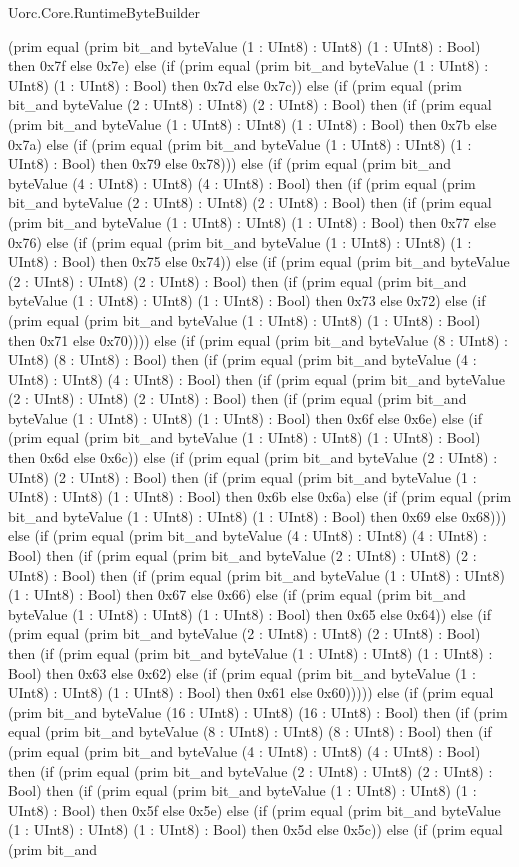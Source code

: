 \begin{lexlean}{Uorc.Core.RuntimeByteBuilder}
\begin{semanticmodule}
{(prim equal (prim bit_and byteValue (1 : UInt8) : UInt8) (1 : UInt8) : Bool) then 0x7f else 0x7e) else (if (prim equal (prim bit_and byteValue (1 : UInt8) : UInt8) (1 : UInt8) : Bool) then 0x7d else 0x7c)) else (if (prim equal (prim bit_and byteValue (2 : UInt8) : UInt8) (2 : UInt8) : Bool) then (if (prim equal (prim bit_and byteValue (1 : UInt8) : UInt8) (1 : UInt8) : Bool) then 0x7b else 0x7a) else (if (prim equal (prim bit_and byteValue (1 : UInt8) : UInt8) (1 : UInt8) : Bool) then 0x79 else 0x78))) else (if (prim equal (prim bit_and byteValue (4 : UInt8) : UInt8) (4 : UInt8) : Bool) then (if (prim equal (prim bit_and byteValue (2 : UInt8) : UInt8) (2 : UInt8) : Bool) then (if (prim equal (prim bit_and byteValue (1 : UInt8) : UInt8) (1 : UInt8) : Bool) then 0x77 else 0x76) else (if (prim equal (prim bit_and byteValue (1 : UInt8) : UInt8) (1 : UInt8) : Bool) then 0x75 else 0x74)) else (if (prim equal (prim bit_and byteValue (2 : UInt8) : UInt8) (2 : UInt8) : Bool) then (if (prim equal (prim bit_and byteValue (1 : UInt8) : UInt8) (1 : UInt8) : Bool) then 0x73 else 0x72) else (if (prim equal (prim bit_and byteValue (1 : UInt8) : UInt8) (1 : UInt8) : Bool) then 0x71 else 0x70)))) else (if (prim equal (prim bit_and byteValue (8 : UInt8) : UInt8) (8 : UInt8) : Bool) then (if (prim equal (prim bit_and byteValue (4 : UInt8) : UInt8) (4 : UInt8) : Bool) then (if (prim equal (prim bit_and byteValue (2 : UInt8) : UInt8) (2 : UInt8) : Bool) then (if (prim equal (prim bit_and byteValue (1 : UInt8) : UInt8) (1 : UInt8) : Bool) then 0x6f else 0x6e) else (if (prim equal (prim bit_and byteValue (1 : UInt8) : UInt8) (1 : UInt8) : Bool) then 0x6d else 0x6c)) else (if (prim equal (prim bit_and byteValue (2 : UInt8) : UInt8) (2 : UInt8) : Bool) then (if (prim equal (prim bit_and byteValue (1 : UInt8) : UInt8) (1 : UInt8) : Bool) then 0x6b else 0x6a) else (if (prim equal (prim bit_and byteValue (1 : UInt8) : UInt8) (1 : UInt8) : Bool) then 0x69 else 0x68))) else (if (prim equal (prim bit_and byteValue (4 : UInt8) : UInt8) (4 : UInt8) : Bool) then (if (prim equal (prim bit_and byteValue (2 : UInt8) : UInt8) (2 : UInt8) : Bool) then (if (prim equal (prim bit_and byteValue (1 : UInt8) : UInt8) (1 : UInt8) : Bool) then 0x67 else 0x66) else (if (prim equal (prim bit_and byteValue (1 : UInt8) : UInt8) (1 : UInt8) : Bool) then 0x65 else 0x64)) else (if (prim equal (prim bit_and byteValue (2 : UInt8) : UInt8) (2 : UInt8) : Bool) then (if (prim equal (prim bit_and byteValue (1 : UInt8) : UInt8) (1 : UInt8) : Bool) then 0x63 else 0x62) else (if (prim equal (prim bit_and byteValue (1 : UInt8) : UInt8) (1 : UInt8) : Bool) then 0x61 else 0x60))))) else (if (prim equal (prim bit_and byteValue (16 : UInt8) : UInt8) (16 : UInt8) : Bool) then (if (prim equal (prim bit_and byteValue (8 : UInt8) : UInt8) (8 : UInt8) : Bool) then (if (prim equal (prim bit_and byteValue (4 : UInt8) : UInt8) (4 : UInt8) : Bool) then (if (prim equal (prim bit_and byteValue (2 : UInt8) : UInt8) (2 : UInt8) : Bool) then (if (prim equal (prim bit_and byteValue (1 : UInt8) : UInt8) (1 : UInt8) : Bool) then 0x5f else 0x5e) else (if (prim equal (prim bit_and byteValue (1 : UInt8) : UInt8) (1 : UInt8) : Bool) then 0x5d else 0x5c)) else (if (prim equal (prim bit_and }
\end{semanticmodule}
\end{lexlean}
